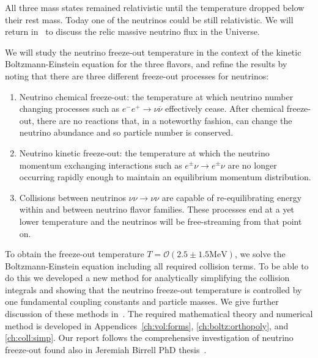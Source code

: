 All three mass states remained relativistic until the temperature dropped below their rest mass. Today one of the neutrinos could be still relativistic. We will return in~ to discuss the relic massive neutrino flux in the Universe.
 
We will study the neutrino freeze-out temperature in the context of the kinetic Boltzmann-Einstein equation for the three flavors, and refine the results by noting that there are three different freeze-out processes for neutrinos:
\begin{enumerate}
\item Neutrino chemical freeze-out: the temperature at which neutrino number changing processes such as $e^-e^+\to\nu\overline\nu$ effectively cease. After chemical freeze-out, there are no reactions that, in a noteworthy fashion, can change the neutrino abundance and so particle number is conserved.
%
\item Neutrino kinetic freeze-out: the temperature at which the neutrino momentum exchanging interactions such as $e^\pm\nu\to e^\pm\nu$ are no longer occurring rapidly enough to maintain an equilibrium momentum distribution. 
%
\item Collisions between neutrinos $\nu\nu\to\nu\nu$ are capable of re-equilibrating energy within and between neutrino flavor families. These processes end at a yet lower temperature and the neutrinos will be free-streaming from that point on.
\end{enumerate}

To obtain the freeze-out temperature $T=\mathcal{O}(2.5\pm1.5\mathrm{MeV})$, we solve the Boltzmann-Einstein equation including all required collision terms. To be able to do this
we developed a new method for analytically simplifying the collision integrals and showing that the neutrino freeze-out temperature is controlled by one fundamental coupling constants and particle masses. We give further discussion of these methods in~. The required mathematical theory and numerical method is developed in Appendices~\ref{ch:vol:forms}, \ref{ch:boltz:orthopoly}, and \ref{ch:coll:simp}. Our report follows the comprehensive investigation of neutrino freeze-out found also in Jeremiah Birrell PhD thesis~\cite{Birrell:2014ona}.

